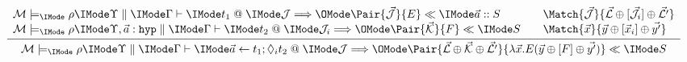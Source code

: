 \[
  \infer{
    \LCFElabSt{\Upsilon}{\Gamma}{
      \TacSeq{t_1}{\vec{a}}{\Diamond_i t_2}
    }{\mathcal{J}}{
      \Pair{
        \vec{\mathcal{L}}
        \oplus
        \vec{\mathcal{K}}
        \oplus
        \vec{\mathcal{L'}}
      }{
        \lambda\vec{x}.E(\vec{y}\oplus[F]\oplus\vec{y'})
      }
    }{S}
  }{
    \begin{array}{l}
      \LCFElabSt{\Upsilon}{\Gamma}{t_1}{\mathcal{J}}{
        \Pair{\vec{\mathcal{J}}}{E}
      }{\vec{a}::S}\\
      \LCFElabSt{\Upsilon,\vec{a}:\SortHyp}{\Gamma}{t_2}{\mathcal{J}_i}{
        \Pair{\vec{\mathcal{K}}}{F}
      }{S}
    \end{array} &
    \begin{array}{l}
      \Match{
        \vec{\mathcal{J}}
      }{
        \vec{\mathcal{L}}\oplus[\vec{\mathcal{J}}_i]\oplus\vec{\mathcal{L'}}
      }\\
      \Match{
        \vec{x}
      }{
        \vec{y}\oplus[\vec{x}_i]\oplus\vec{y'}
      }
    \end{array}
  }
\]


